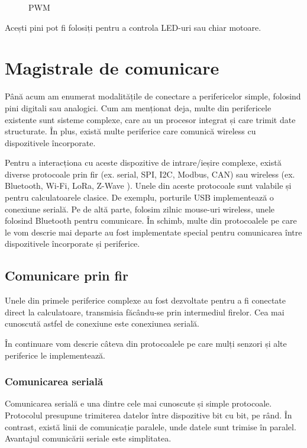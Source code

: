 \begin{figure}[htbp]
	\centering
	\def\svgwidth{\columnwidth}
	
	\caption{PWM}
	\label{fig:embed-pwm}
\end{figure}

Acești pini pot fi folosiți pentru a controla LED-uri sau chiar motoare.

\section{Magistrale de comunicare}
\label{sec:embed-bus}

Până acum am enumerat modalitățile de conectare a perifericelor simple, folosind
pini digitali sau analogici. Cum am menționat deja, multe din perifericele
existente sunt sisteme complexe, care au un procesor integrat și care trimit
date structurate. În plus, există multe periferice care comunică wireless cu
dispozitivele încorporate.

Pentru a interacționa cu aceste dispozitive de intrare/ieșire complexe, există
diverse protocoale prin fir (ex. serial, SPI, I2C, Modbus, CAN) sau wireless
(ex. Bluetooth, Wi-Fi, LoRa, Z-Wave ). Unele din aceste protocoale sunt valabile
și pentru calculatoarele clasice. De exemplu, porturile USB implementează o
conexiune serială. Pe de altă parte, folosim zilnic mouse-uri wireless, unele
folosind Bluetooth pentru comunicare. În schimb, multe din protocoalele pe care
le vom descrie mai departe au fost implementate special pentru comunicarea între
dispozitivele încorporate și periferice.

\subsection{Comunicare prin fir}
\label{sec:embed-bus-wire}

Unele din primele periferice complexe au fost dezvoltate pentru a fi conectate
direct la calculatoare, transmisia făcându-se prin intermediul firelor. Cea mai
cunoscută astfel de conexiune este conexiunea serială.

În continuare vom descrie câteva din protocoalele pe care mulți senzori și alte
periferice le implementează.

\subsubsection{Comunicarea serială}
\label{sec:embed-bus-wire-serial}

Comunicarea serială e una dintre cele mai cunoscute și simple protocoale.
Protocolul presupune trimiterea datelor între dispozitive bit cu bit, pe rând.
În contrast, există linii de comunicație paralele, unde datele sunt trimise în
paralel. Avantajul comunicării seriale este simplitatea.

